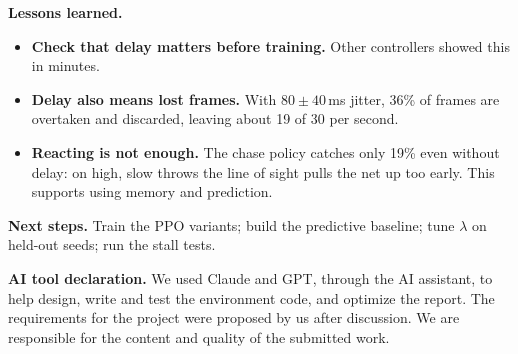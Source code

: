 \documentclass[10pt,a4paper]{article}
\begin{document}
\textbf{Lessons learned.}
\begin{itemize}
  \item \textbf{Check that delay matters before training.} Other controllers showed this in minutes.
  \item \textbf{Delay also means lost frames.} With $80 \pm 40$\,ms jitter, 36\% of frames are overtaken and
        discarded, leaving about 19 of 30 per second.
  \item \textbf{Reacting is not enough.} The chase policy catches only 19\% even without delay: on high,
        slow throws the line of sight pulls the net up too early. This supports using memory and
        prediction.
\end{itemize}

\textbf{Next steps.} Train the PPO variants; build the predictive baseline; tune $\lambda$ on held-out seeds; run the stall tests.

\textbf{AI tool declaration.} We used Claude and GPT, through the AI assistant, to help design, write and
test the environment code, and optimize the report. The requirements for the project were
proposed by us after discussion. We are responsible for the content and quality of the submitted work.
\end{document}
